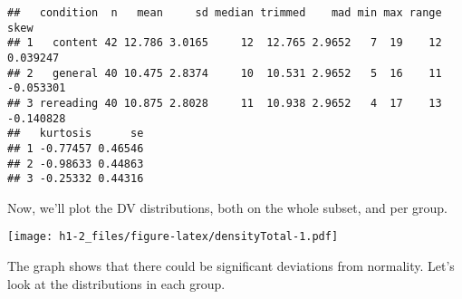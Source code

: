 \documentclass[12pt,]{article}
\newenvironment{Shaded}{\begin{snugshade}}{\end{snugshade}}
\newcommand{\DataTypeTok}[1]{\textcolor[rgb]{0.13,0.29,0.53}{#1}}
\newcommand{\FloatTok}[1]{\textcolor[rgb]{0.00,0.00,0.81}{#1}}
\newcommand{\KeywordTok}[1]{\textcolor[rgb]{0.13,0.29,0.53}{\textbf{#1}}}
\newcommand{\NormalTok}[1]{#1}
\newcommand{\OperatorTok}[1]{\textcolor[rgb]{0.81,0.36,0.00}{\textbf{#1}}}
\newcommand{\StringTok}[1]{\textcolor[rgb]{0.31,0.60,0.02}{#1}}
\begin{document}
\begin{verbatim}
##   condition  n   mean     sd median trimmed    mad min max range      skew
## 1   content 42 12.786 3.0165     12  12.765 2.9652   7  19    12  0.039247
## 2   general 40 10.475 2.8374     10  10.531 2.9652   5  16    11 -0.053301
## 3 rereading 40 10.875 2.8028     11  10.938 2.9652   4  17    13 -0.140828
##   kurtosis      se
## 1 -0.77457 0.46546
## 2 -0.98633 0.44863
## 3 -0.25332 0.44316
\end{verbatim}

Now, we'll plot the DV distributions, both on the whole subset, and per
group.

\begin{Shaded}
\end{Shaded}

\texttt{[image: h1-2\_files/figure-latex/densityTotal-1.pdf]}

The graph shows that there could be significant deviations from
normality. Let's look at the distributions in each group.

\begin{Shaded}
\end{Shaded}
\end{document}
